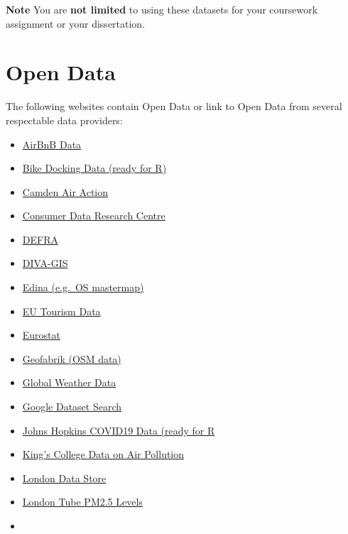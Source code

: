 \documentclass[
]{book}
\providecommand{\tightlist}{%
  \setlength{\itemsep}{0pt}\setlength{\parskip}{0pt}}
\begin{document}
\textbf{Note}
You are \textbf{not limited} to using these datasets for your coursework assignment or your dissertation.

\hypertarget{open-data}{%
\section{Open Data}\label{open-data}}

The following websites contain Open Data or link to Open Data from several respectable data providers:

\begin{itemize}
\tightlist
\item
  \href{http://insideairbnb.com/get-the-data.html}{AirBnB Data}
\item
  \href{https://docs.ropensci.org/bikedata/}{Bike Docking Data (ready for R)}
\item
  \href{https://camdenairaction.wordpress.com/2017/02/20/schools-monitoring-project-spring-2017/}{Camden Air Action}
\item
  \href{https://data.cdrc.ac.uk/}{Consumer Data Research Centre}
\item
  \href{https://environment.data.gov.uk/}{DEFRA}
\item
  \href{https://www.diva-gis.org/}{DIVA-GIS}
\item
  \href{https://digimap.edina.ac.uk/}{Edina (e.g.~OS mastermap)}
\item
  \href{https://ec.europa.eu/eurostat/statistics-explained/index.php/Tourism_statistics}{EU Tourism Data}
\item
  \href{https://ec.europa.eu/eurostat}{Eurostat}
\item
  \href{https://www.geofabrik.de/}{Geofabrik (OSM data)}
\item
  \href{https://rp5.ru/Weather_in_the_world}{Global Weather Data}
\item
  \href{https://datasetsearch.research.google.com/}{Google Dataset Search}
\item
  \href{https://github.com/RamiKrispin/coronavirus}{Johns Hopkins COVID19 Data (ready for R}
\item
  \href{https://www.londonair.org.uk/LondonAir/Default.aspx}{King's College Data on Air Pollution}
\item
  \href{https://data.london.gov.uk/}{London Data Store}
\item
  \href{https://www.ft.com/content/6f381ad4-fef7-11e9-be59-e49b2a136b8d}{London Tube PM2.5 Levels}
\item

\end{itemize}
\end{document}

